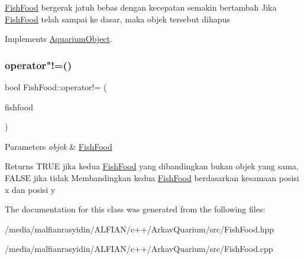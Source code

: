 \mbox{\hyperlink{class_fish_food}{Fish\+Food}} bergerak jatuh bebas dengan kecepatan semakin bertambah Jika \mbox{\hyperlink{class_fish_food}{Fish\+Food}} telah sampai ke dasar, maka objek tersebut dihapus 

Implements \mbox{\hyperlink{class_aquarium_object_a42c4de640f89ac8aebc26b7618578575}{Aquarium\+Object}}.

\mbox{\label{class_fish_food_a3df73ecdd9d67d9a29f352e48ed74123}} 
\subsubsection{\texorpdfstring{operator"!=()}{operator!=()}}
{\footnotesize\ttfamily bool Fish\+Food\+::operator!= (\begin{DoxyParamCaption}\item[{const \mbox{\hyperlink{class_fish_food}{Fish\+Food}} \&}]{fishfood }\end{DoxyParamCaption})}


\begin{DoxyParams}{Parameters}
{\em objek} & \mbox{\hyperlink{class_fish_food}{Fish\+Food}} \\
\hline
\end{DoxyParams}
\begin{DoxyReturn}{Returns}
T\+R\+UE jika kedua \mbox{\hyperlink{class_fish_food}{Fish\+Food}} yang dibandingkan bukan objek yang sama, F\+A\+L\+SE jika tidak Membandingkan kedua \mbox{\hyperlink{class_fish_food}{Fish\+Food}} berdasarkan kesamaan posisi x dan posisi y 
\end{DoxyReturn}


The documentation for this class was generated from the following files\+:\begin{DoxyCompactItemize}
\item 
/media/malfianrasyidin/\+A\+L\+F\+I\+A\+N/c++/\+Arkav\+Quarium/src/Fish\+Food.\+hpp\item 
/media/malfianrasyidin/\+A\+L\+F\+I\+A\+N/c++/\+Arkav\+Quarium/src/Fish\+Food.\+cpp\end{DoxyCompactItemize}
